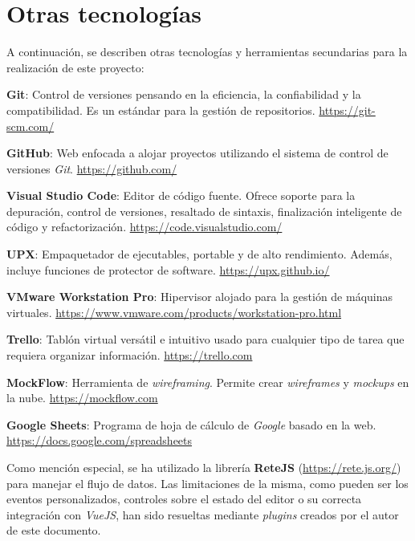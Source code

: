 \section{Otras tecnologías} \label{sec:othertools}

A continuación, se describen otras tecnologías y herramientas secundarias para la realización de este proyecto:\n

\textbf{Git}: Control de versiones pensando en la eficiencia, la confiabilidad y la compatibilidad. Es un estándar para la gestión de repositorios. \color{gray}\url{https://git-scm.com/}\color{black}\n

\textbf{GitHub}: Web enfocada a alojar proyectos utilizando el sistema de control de versiones \textit{Git}. \color{gray}\url{https://github.com/}\color{black}\n

\textbf{Visual Studio Code}: Editor de código fuente. Ofrece soporte para la depuración, control de versiones, resaltado de sintaxis, finalización inteligente de código y refactorización. \color{gray}\url{https://code.visualstudio.com/}\color{black}\n

\textbf{UPX}: Empaquetador de ejecutables, portable y de alto rendimiento. Además, incluye funciones de protector de software. \color{gray}\url{https://upx.github.io/}\color{black}\n

\textbf{VMware Workstation Pro}: Hipervisor alojado para la gestión de máquinas virtuales. \color{gray}\url{https://www.vmware.com/products/workstation-pro.html}\color{black}\n

\textbf{Trello}: Tablón virtual versátil e intuitivo usado para cualquier tipo de tarea que requiera organizar información. \color{gray}\url{https://trello.com}\color{black}\n

\textbf{MockFlow}: Herramienta de \textit{wireframing}. Permite crear \textit{wireframes} y \textit{mockups} en la nube. \color{gray}\url{https://mockflow.com}\color{black}\n

\textbf{Google Sheets}: Programa de hoja de cálculo de \textit{Google} basado en la web. \color{gray}\url{https://docs.google.com/spreadsheets}\color{black}\sn

Como mención especial, se ha utilizado la librería \textbf{ReteJS} (\url{https://rete.js.org/}) para manejar el flujo de datos. Las limitaciones de la misma, como pueden ser los eventos personalizados, controles sobre el estado del editor o su correcta integración con \textit{VueJS}, han sido resueltas mediante \textit{plugins} creados por el autor de este documento.
